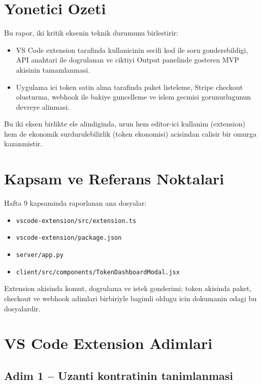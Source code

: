 \documentclass[11pt,a4paper]{article}
\begin{document}
\section*{Yonetici Ozeti}

Bu rapor, iki kritik eksenin teknik durumunu birlestirir:
\begin{itemize}[leftmargin=1.5em]
	\item VS Code extension tarafinda kullanicinin secili kod ile soru gonderebildigi, API anahtari ile dogrulanan ve ciktiyi Output panelinde gosteren MVP akisinin tamamlanmasi.
	\item Uygulama ici token satin alma tarafinda paket listeleme, Stripe checkout olusturma, webhook ile bakiye guncelleme ve islem gecmisi gorunurlugunun devreye alinmasi.
\end{itemize}

Bu iki eksen birlikte ele alindiginda, urun hem editor-ici kullanim (extension) hem de ekonomik surdurulebilirlik (token ekonomisi) acisindan calisir bir omurga kazanmistir.

\newpage
\tableofcontents
\newpage

\section{Kapsam ve Referans Noktalari}

Hafta 9 kapsaminda raporlanan ana dosyalar:
\begin{itemize}[leftmargin=1.5em]
	\item \texttt{vscode-extension/src/extension.ts}
	\item \texttt{vscode-extension/package.json}
	\item \texttt{server/app.py}
	\item \texttt{client/src/components/TokenDashboardModal.jsx}
\end{itemize}

\begin{notebox}
Extension akisinda komut, dogrulama ve istek gonderimi; token akisinda paket, checkout ve webhook adimlari birbiriyle bagimli oldugu icin dokumanin odagi bu dosyalardir.
\end{notebox}

\section{VS Code Extension Adimlari}

\subsection{Adim 1 -- Uzanti kontratinin tanimlanmasi}
\end{document}
